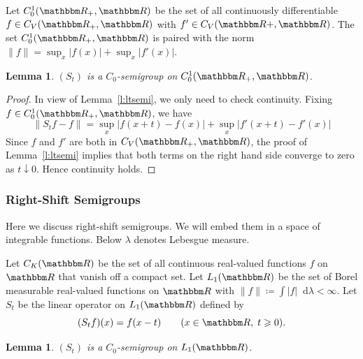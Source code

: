 \documentclass[12pt, reqno]{amsart}
\renewcommand{\geq}{\geqslant}
\newcommand{\1}{\mathbbm 1}
\newcommand*\diff{\mathop{}\!\mathrm{d}}
\newcommand{\RR}{\mathbbm R}
\theoremstyle{plain}
\newtheorem{lemma}[theorem]{Lemma}
\theoremstyle{definition}
\begin{document}
Let $C_0^1(\RR_+, \RR)$ be the set of all continuously differentiable $f \in
C_V(\RR_+, \RR)$ with $f' \in C_V(\RR+, \RR)$.  The set $C_0^1(\RR_+, \RR)$ is paired
with the norm $\|f\| = \sup_x |f(x)| + \sup_x |f'(x)|$.  

\begin{lemma}\label{l:ltsemi2}
    $(S_t)$ is a $C_0$-semigroup on $C_0^1(\RR_+, \RR)$.  
\end{lemma}

\begin{proof}
    In view of Lemma~\ref{l:ltsemi}, we only need to check continuity.
    Fixing $f \in C_0^1(\RR_+, \RR)$, we have
    \begin{equation*}
        \| S_t f - f \|
        = \sup_x | f(x + t)  - f(x) | + \sup_x | f'(x + t)  - f'(x) |
    \end{equation*}
    Since $f$ and $f'$ are both in $C_V(\RR_+, \RR)$, the proof of
    Lemma~\ref{l:ltsemi} implies that both terms on the right hand side
    converge to zero as $t \downarrow 0$.  Hence continuity holds.
\end{proof}

\subsubsection{Right-Shift Semigroups}\label{ss:rssemi}

Here we discuss right-shift semigroups.  We will embed them in a space of
integrable functions.  Below $\lambda$ denotes Lebesgue measure.

Let $C_K(\RR)$ be the set of all continuous real-valued functions $f$ on
$\RR$ that vanish off a compact set.  Let $L_1(\RR)$ be the set of 
Borel measurable real-valued functions on $\RR$ with $\| f \| \coloneq \int
|f| \diff \lambda < \infty$.  Let $S_t$ be the linear operator on $L_1(\RR)$
defined by 
%
\begin{equation*}
    (S_t f)(x) = f(x - t)
    \qquad (x \in \RR, \; t \geq 0).
\end{equation*}
%

\begin{lemma}\label{l:rtsemi}
    $(S_t)$ is a $C_0$-semigroup on $L_1(\RR)$.  
\end{lemma}
\end{document}
